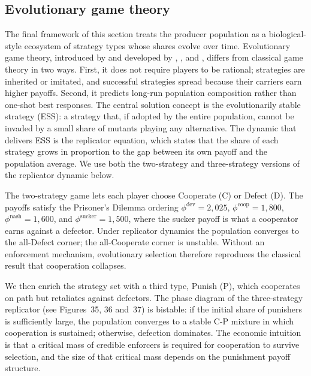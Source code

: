\subsection{Evolutionary game theory}
\label{subsec:evo}

The final framework of this section treats the producer population as
a biological-style ecosystem of strategy types whose shares evolve over
time. Evolutionary game theory, introduced by \citet{maynardsmith1973}
and developed by \citet[p.~??]{weibull1995}, \citet[p.~??]{hofbauersigmund1998}, and
\citet[p.~??]{hofbauerweibull1996},
differs from classical game theory in two ways. First, it does not
require players to be rational; strategies are inherited or imitated,
and successful strategies spread because their carriers earn higher
payoffs. Second, it predicts long-run population composition rather
than one-shot best responses. The central solution concept is the
evolutionarily stable strategy (ESS): a strategy that, if adopted by
the entire population, cannot be invaded by a small share of mutants
playing any alternative. The dynamic that delivers ESS is the
replicator equation, which states that the share of each strategy grows
in proportion to the gap between its own payoff and the population
average. We use both the two-strategy and three-strategy versions of
the replicator dynamic below.

The two-strategy game lets each player choose Cooperate (C) or Defect
(D). The payoffs satisfy the Prisoner's Dilemma ordering
$\phi^{\text{dev}} = 2{,}025$, $\phi^{\text{coop}} = 1{,}800$,
$\phi^{\text{nash}} = 1{,}600$, and $\phi^{\text{sucker}} = 1{,}500$,
where the sucker payoff is what a cooperator earns against a defector.
Under replicator dynamics the population converges to the all-Defect
corner; the all-Cooperate corner is unstable. Without an enforcement
mechanism, evolutionary selection therefore reproduces the classical
result that cooperation collapses.

We then enrich the strategy set with a third type, Punish (P), which
cooperates on path but retaliates against defectors. The phase diagram
of the three-strategy replicator (see Figures~35, 36 and~37) is
bistable: if the initial share of punishers is sufficiently large, the
population converges to a stable C-P mixture in which cooperation is
sustained; otherwise, defection dominates. The economic intuition is
that a critical mass of credible enforcers is required for cooperation
to survive selection, and the size of that critical mass depends on the
punishment payoff structure.


